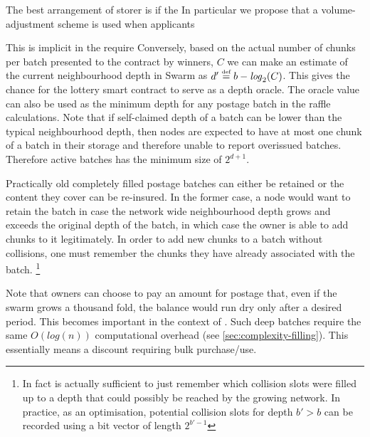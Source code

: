 The best arrangement of storer is if the 
In particular we propose that a volume-adjustment scheme is used  when applicants 

This is implicit in the require
Conversely, based on the actual number of chunks per batch presented to the contract by winners, $C$ we can make an estimate of the current neighbourhood depth in Swarm as $d'\overset{\textrm{\tiny def}}{=} b - \mathit{log}_2(C)$. This gives the chance for the lottery smart contract to serve as a depth oracle. The oracle value can also be used as the minimum depth for any postage batch in the raffle calculations. Note that if self-claimed depth of a batch can be lower than the typical neighbourhood depth, then nodes are expected to have at  most one chunk of a batch in their storage and therefore unable to report overissued batches. Therefore active batches has the minimum size of $2^{d+1}$.


Practically old completely filled postage batches can either be retained or the content they cover can be re-insured. In the former case, a node would want to retain the batch in case the network wide neighbourhood depth grows and exceeds the original depth of the batch, in which case the owner is able to add chunks to it legitimately. 
In order to add new chunks to a batch without collisions, one must remember the chunks they have already associated with the batch.%
%
\footnote{In fact is actually sufficient to just remember which collision slots were filled up to a depth that could possibly be reached by the growing network. In practice, as an optimisation, potential collision slots for depth  $b' >b$ can be recorded using a bit vector of length $2^{b'-1}$}
%

Note that owners can choose to pay an amount for postage that, even if the swarm grows a thousand fold, the balance would run dry only after a desired period. This becomes important in the context of .
Such deep batches require the same $O(\mathit{log}(n))$ computational overhead (see \ref{sec:complexity-filling}). This essentially means a discount   requiring  bulk purchase/use.







